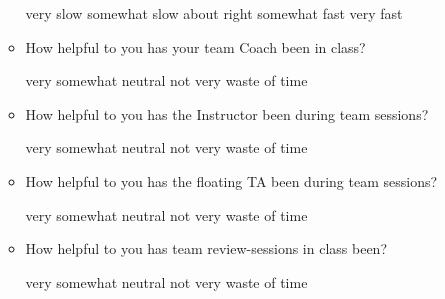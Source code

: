 \documentclass[handout]{mcs}
\begin{document}
\begin{itemize}
\begin{itemize}
\begin{center}
very slow\hspace{0.3in} somewhat slow\hspace{0.3in} about
right\hspace{0.3in} somewhat fast\hspace{0.3in} very fast
\end{center}

\item How helpful to you has your team Coach been in class?

\begin{center}
very\hspace{0.5in} somewhat \hspace{0.5in} neutral\hspace{0.5in} not
very \hspace{0.5in} waste of time
\end{center}

\item How helpful to you has the Instructor been during team sessions?

\begin{center}
very\hspace{0.5in} somewhat \hspace{0.5in} neutral\hspace{0.5in} not
very \hspace{0.5in} waste of time
\end{center}

\item How helpful to you has the floating TA been during team sessions?

\begin{center}
very\hspace{0.5in} somewhat \hspace{0.5in} neutral\hspace{0.5in} not
very \hspace{0.5in} waste of time
\end{center}

\item How helpful to you has team review-sessions in class been?

\begin{center}
very\hspace{0.5in} somewhat \hspace{0.5in} neutral\hspace{0.5in} not
very \hspace{0.5in} waste of time
\end{center}


\end{itemize}
\end{itemize}
\end{document}
